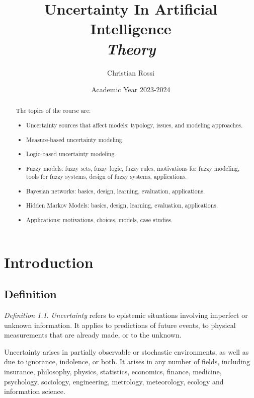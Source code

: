 \documentclass[12pt, a4paper]{report}
\title{Uncertainty In Artificial Intelligence \\ \textit{Theory}}
\author{Christian Rossi}
\date{Academic Year 2023-2024}
\theoremstyle{remark}
\newtheorem*{remark}{Definition}
\begin{document}
\maketitle

\newpage

\begin{abstract}
    The topics of the course are:
    \begin{itemize}
        \item Uncertainty sources that affect models: typology, issues, and modeling approaches.
        \item Measure-based uncertainty modeling.
        \item Logic-based uncertainty modeling.
        \item Fuzzy models: fuzzy sets, fuzzy logic, fuzzy rules, motivations for fuzzy modeling, tools for fuzzy systems, design 
            of fuzzy systems, applications.
        \item Bayesian networks: basics, design, learning, evaluation, applications.
        \item Hidden Markov Models: basics, design, learning, evaluation, applications.
        \item Applications: motivations, choices, models, case studies.
    \end{itemize}
\end{abstract}

\newpage

\tableofcontents

\newpage

\chapter{Introduction}
    \section{Definition}
    \begin{remark}
        \emph{Uncertainty} refers to epistemic situations involving imperfect or unknown information. It applies to predictions 
        of future events, to physical measurements that are already made, or to the unknown. 
    \end{remark}
    Uncertainty arises in partially observable or stochastic environments, as well as due to ignorance, indolence, or both. It arises 
    in any number of fields, including insurance, philosophy, physics, statistics, economics, finance, medicine, psychology, sociology, 
    engineering, metrology, meteorology, ecology and information science.
    
\end{document}
